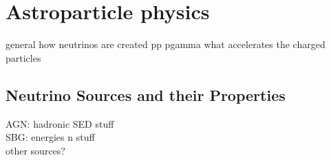 \chapter{Astroparticle physics}

general how neutrinos are created pp pgamma
what accelerates the charged particles


\section{Neutrino Sources and their Properties}

AGN: hadronic SED stuff\\
SBG: energies n stuff\\
other sources?
